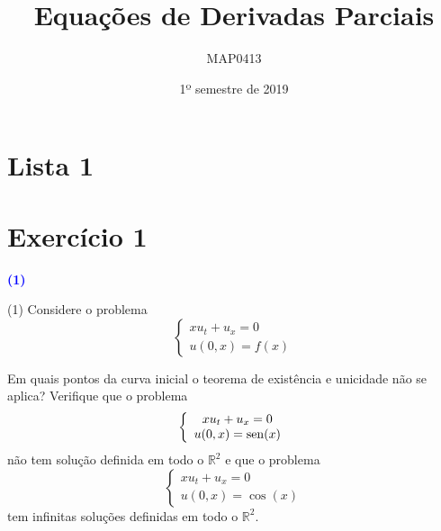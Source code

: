 \documentclass[11pt,a4paper]{article}
\title{Equações de Derivadas Parciais}
\author{MAP0413}
\date{1º semestre de 2019}
\newcommand{\exercicio}[1]{\section*{Exercício #1} \textcolor{blue}{\bf(#1)}}
\newcommand{\dividiritens}[1]{\begin{tasks}[counter-format={(tsk[a])},label-width=3.6ex, label-format = {\bfseries}, column-sep = {0pt}](1) #1 \end{tasks}}
\newcommand{\pers}[1]{\textcolor{Floresta}{$\negrito{(#1)} $}}
\begin{document}
\maketitle
\tableofcontents
\newpage


\section{\textcolor{Floresta}{Lista 1}}


\exercicio{1}
\dividiritens{
\task[\pers{a}] Considere o problema
\[
\left\{\begin{array}{c}
xu_t + u_x = 0 \\
u(0,x) = f(x)
\end{array}
\right.
\]

Em quais pontos da curva inicial o teorema de existência e unicidade não se
aplica?
\task[\pers{b}]
Verifique que o problema
\[
\left\{\begin{array}{c}
xu_t + u_x = 0 \\
u(0,x) = {\rm sen}(x)
\end{array}
\right.
\]
não tem solução definida em todo o $\mathbb{R}^2$ e que o problema
\[
\left\{\begin{array}{c}
xu_t + u_x = 0 \\
u(0,x) = \cos(x)
\end{array}
\right.
\]
tem infinitas soluções definidas em todo o $\mathbb{R}^2.$
}
\end{document}
